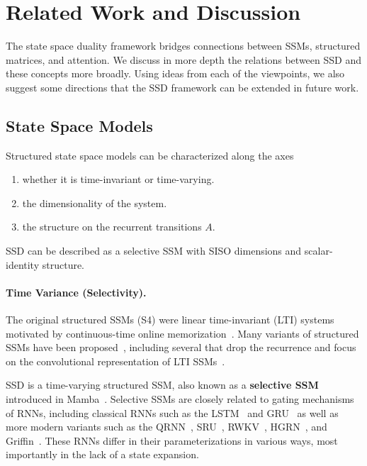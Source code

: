 \documentclass{article}
\newcommand{\citep}{\parencite}
\begin{document}
\section{Related Work and Discussion}
\label{sec:related}

The state space duality framework bridges connections between SSMs, structured matrices, and attention.
We discuss in more depth the relations between SSD and these concepts more broadly.
Using ideas from each of the viewpoints, we also suggest some directions that the SSD framework can be extended in future work.

\subsection{State Space Models}
\label{sec:related:ssm}

Structured state space models can be characterized along the axes
\begin{enumerate}[label=(\roman*)]
  \item whether it is time-invariant or time-varying.
  \item the dimensionality of the system.
  \item the structure on the recurrent transitions $A$.
\end{enumerate}
SSD can be described as a selective SSM with SISO dimensions and scalar-identity structure.

\paragraph{Time Variance (Selectivity).}
The original structured SSMs (S4) were linear time-invariant (LTI) systems~\citep{gu2023thesis,gu2022efficiently} motivated by continuous-time online memorization~\citep{gu2020hippo,gu2021combining,gu2023train}.
Many variants of structured SSMs have been proposed~\citep{gupta2022diagonal,gu2022parameterization,smith2023s5,ma2023mega,dao2023hungry}, including several that drop the recurrence and focus on the convolutional representation of LTI SSMs~\citep{li2023makes,poli2023hyena,fu2023simple,qin2023toeplitz}.

SSD is a time-varying structured SSM, also known as a \textbf{selective SSM} introduced in Mamba~\citep{gu2023mamba}.
Selective SSMs are closely related to gating mechanisms of RNNs, including classical RNNs such as the LSTM~\citep{lstm} and GRU~\citep{chung2014empirical} as well as more modern variants such as the QRNN~\citep{bradbury2016quasi}, SRU~\citep{lei2017simple,lei2021attention}, RWKV~\citep{peng2023rwkv}, HGRN~\citep{qin2023hierarchically}, and Griffin~\citep{de2024griffin,botev2024recurrentgemma}.
These RNNs differ in their parameterizations in various ways, most importantly in the lack of a state expansion.
\end{document}
